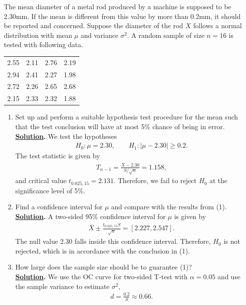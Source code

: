 The mean diameter of a metal rod produced by a machine is supposed to be 2.30mm. If the mean is different from this value by more than 0.2mm, it should be reported and concerned. Suppose the diameter of the rod $X$ follows a normal distribution with mean $\mu$ and variance $\sigma^2$. A random sample of size $n = 16$ is tested with following data.
\begin{table}[H]
	\centering
	\begin{tabular}{cccc}
		2.55 & 2.11 & 2.76 & 2.19 \\
		2.94 & 2.41 & 2.27 & 1.98 \\
		2.72 & 2.26 & 2.65 & 2.68 \\
		2.15 & 2.33 & 2.32 & 1.88
	\end{tabular}
\end{table}
\begin{enumerate}
	\item Set up and perform a suitable hypothesis test procedure for the mean such that the test conclusion will have at most 5\% chance of being in error. \\
	\textbf{\underline{Solution}.} We test the hypotheses
	\begin{align*}
	H_0:\mu = 2.30, \qquad H_1: |\mu - 2.30| \geq 0.2.
	\end{align*}
	The test statistic is given by
	\begin{align*}
	T_{n-1} = \frac{\overline{X}-2.30}{S/\sqrt{n}} = 1.158,
	\end{align*}
	and critical value $t_{0.025, 15} = 2.131$. Therefore, we fail to reject $H_0$ at the significance level of 5\%.
	\item Find a confidence interval for $\mu$ and compare with the results from (1). \\
	\textbf{\underline{Solution}.} A two-sided 95\% confidence interval for $\mu$ is given by
	\begin{align*}
	\overline{X} \pm \frac{t_{0.025, 15} S}{\sqrt{n}} = [2.227, 2.547].
	\end{align*}
	The null value 2.30 falls inside this confidence interval. Therefore, $H_0$ is not rejected, which is in accordance with the conclusion in (1).
	\item How large does the sample size should be to guarantee (1)? \\
	\textbf{\underline{Solution}.} We use the OC curve for two-sided T-test with $\alpha = 0.05$ and use the sample variance to estimate $\sigma^2$,
	\begin{align*}
	d = \frac{0.2}{S} \approx 0.66.

\end{align*}
\end{enumerate}
